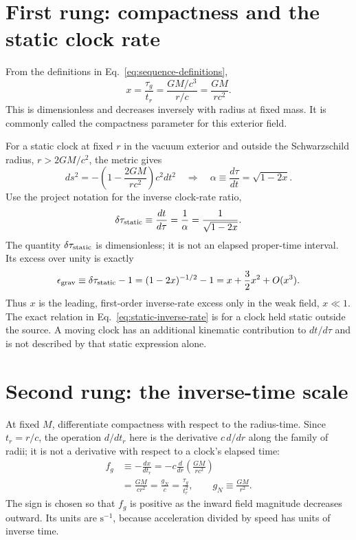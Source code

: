 \documentclass[12pt]{article}
\begin{document}
\section{First rung: compactness and the static clock rate}
\label{sec:compactness}

From the definitions in Eq.~\eqref{eq:sequence-definitions},
\begin{equation}
  x=\frac{\tau_g}{t_r}
   =\frac{GM/c^3}{r/c}
   =\frac{GM}{rc^2}.
  \label{eq:compactness}
\end{equation}
This is dimensionless and decreases inversely with radius at fixed mass. It is commonly called the compactness parameter for this exterior field.

For a static clock at fixed $r$ in the vacuum exterior and outside the Schwarzschild radius, $r>2GM/c^2$, the metric gives
\begin{equation}
  ds^2=-\left(1-\frac{2GM}{rc^2}\right)c^2dt^2
  \quad\Longrightarrow\quad
  \alpha\equiv\frac{d\tau}{dt}=\sqrt{1-2x}.
  \label{eq:static-lapse}
\end{equation}
Use the project notation for the inverse clock-rate ratio,
\begin{equation}
  \delta\tau_{\rm static}
  \equiv\frac{dt}{d\tau}
  =\frac{1}{\alpha}
  =\frac{1}{\sqrt{1-2x}}.
  \label{eq:static-inverse-rate}
\end{equation}
The quantity $\delta\tau_{\rm static}$ is dimensionless; it is not an elapsed proper-time interval. Its excess over unity is exactly
\begin{equation}
  \epsilon_{\rm grav}
  \equiv\delta\tau_{\rm static}-1
  =(1-2x)^{-1/2}-1
  =x+\frac{3}{2}x^2+O(x^3).
  \label{eq:clock-expansion}
\end{equation}
Thus $x$ is the leading, first-order inverse-rate excess only in the weak field, $x\ll1$. The exact relation in Eq.~\eqref{eq:static-inverse-rate} is for a clock held static outside the source. A moving clock has an additional kinematic contribution to $dt/d\tau$ and is not described by that static expression alone.

\section{Second rung: the inverse-time scale}
\label{sec:inverse-time}

At fixed $M$, differentiate compactness with respect to the radius-time. Since $t_r=r/c$, the operation $d/dt_r$ here is the derivative $c\,d/dr$ along the family of radii; it is not a derivative with respect to a clock's elapsed time:
\begin{align}
  f_g
  &\equiv-\frac{dx}{dt_r}
   =-c\frac{d}{dr}\left(\frac{GM}{rc^2}\right) \\
  &=\frac{GM}{cr^2}
   =\frac{g_N}{c}
   =\frac{\tau_g}{t_r^2},
  \qquad g_N\equiv\frac{GM}{r^2}.
  \label{eq:inverse-time-scale}
\end{align}
The sign is chosen so that $f_g$ is positive as the inward field magnitude decreases outward. Its units are $\mathrm{s^{-1}}$, because acceleration divided by speed has units of inverse time.
\end{document}
